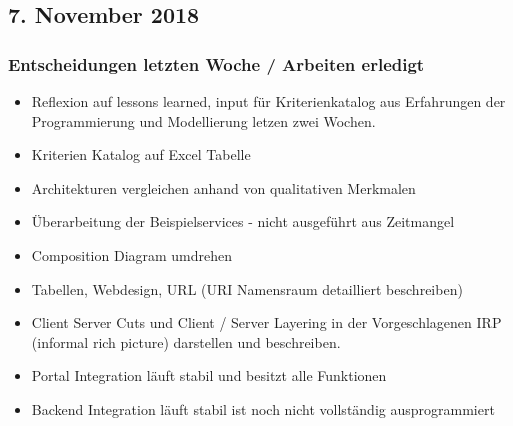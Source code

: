 \documentclass{article}
\begin{document}
    
\subsection{7. November 2018} \label{chap:Protokols:7nov2018}

\subsubsection{Entscheidungen letzten Woche / Arbeiten erledigt}
\begin{itemize}
    \item Reflexion auf lessons learned, input für Kriterienkatalog aus Erfahrungen der Programmierung und Modellierung letzen zwei Wochen.
    \item Kriterien Katalog auf Excel Tabelle
    \item Architekturen vergleichen anhand von qualitativen Merkmalen 
    \item Überarbeitung der Beispielservices - nicht ausgeführt aus Zeitmangel
    \item Composition Diagram umdrehen
    \item Tabellen, Webdesign, URL (URI Namensraum detailliert beschreiben) \checkmark
    \item Client Server Cuts und Client / Server Layering in der Vorgeschlagenen IRP (informal rich picture) darstellen und beschreiben. \checkmark
    \item Portal Integration läuft stabil und besitzt alle Funktionen \checkmark
    \item Backend Integration läuft stabil ist noch nicht vollständig ausprogrammiert \checkmark
\end{itemize}
\end{document}
